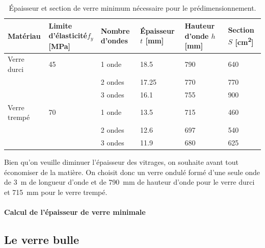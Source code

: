 \documentclass[11pt,titlepage]{article}
\begin{document}
\begin{table}[H]
\centering
\caption{Épaisseur et section de verre minimum nécessaire pour le prédimensionnement.}
\label{tab:mat_predimsin}
\begin{tabularx}{\textwidth}{l*{5}{Y}}
\toprule
\textbf{Matériau} & \textbf{Limite d'élasticité}$f_y$ [\unit{\mega\pascal}] &\textbf{Nombre d'ondes} & \textbf{Épaisseur} $t$ [\unit{\milli\metre}]& \textbf{Hauteur d'onde} $h$ [\unit{\milli\metre}] & \textbf{Section} $S$ [\unit{\square\centi\meter}] \\\midrule
Verre durci & 45 & 1 onde & 18.5 &790& 640 \\
 & & 2 ondes & 17.25 &770& 770 \\
 & & 3 ondes & 16.1 & 755&900 \\
Verre trempé & 70 & 1 onde & 13.5 &715& 460 \\
 & & 2 ondes & 12.6 & 697&540 \\
 & & 3 ondes & 11.9 & 680&625 \\
\bottomrule
\end{tabularx}
\end{table}
Bien qu'on veuille diminuer l'épaisseur des vitrages, on souhaite avant tout économiser de la matière. On choisit donc un verre ondulé formé d'une seule onde de \qty{3}{\metre} de longueur d'onde et de \qty{790}{\milli\metre} de hauteur d'onde pour le verre durci et \qty{715}{\milli\metre} pour le verre trempé.

\paragraph{Calcul de l'épaisseur de verre minimale}

\subsection{Le verre bulle}
\end{document}
